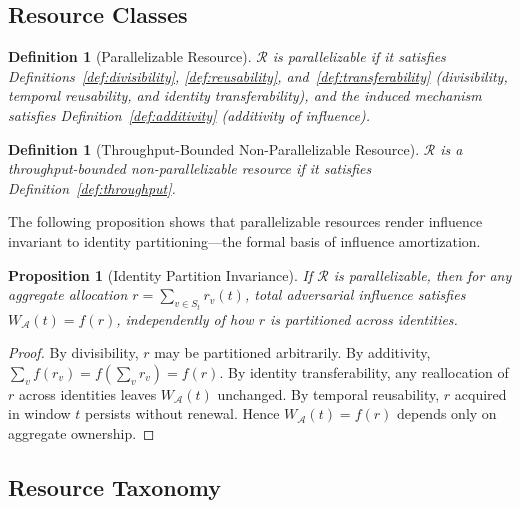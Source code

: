 \documentclass[10pt,journal,compsoc]{IEEEtran}
\newtheorem{proposition}[theorem]{Proposition}
\newtheorem{definition}[theorem]{Definition}
\theoremstyle{remark}
\begin{document}
	\subsection{Resource Classes}
	\label{ssec:classes}
	
	\begin{definition}[Parallelizable Resource]
		\label{def:parallelizable}
		$\mathcal{R}$ is \emph{parallelizable} if it satisfies
		Definitions~\ref{def:divisibility},
		\ref{def:reusability}, and~\ref{def:transferability}
		(divisibility, temporal reusability, and identity
		transferability), and the induced mechanism satisfies
		Definition~\ref{def:additivity} (additivity of
		influence).
	\end{definition}
	
	\begin{definition}[Throughput-Bounded Non-Parallelizable Resource]
		\label{def:nonparallelizable}
		$\mathcal{R}$ is a \emph{throughput-bounded
			non-parallelizable resource} if it satisfies
		Definition~\ref{def:throughput}.
	\end{definition}
	
	The following proposition shows that parallelizable
	resources render influence invariant to identity
	partitioning---the formal basis of influence amortization.
	
	\begin{proposition}[Identity Partition Invariance]
		\label{prop:invariance}
		If $\mathcal{R}$ is parallelizable, then for any
		aggregate allocation $r = \sum_{v \in S_t} r_v(t)$,
		total adversarial influence satisfies
		$W_{\mathcal{A}}(t) = f(r)$,
		independently of how $r$ is partitioned across
		identities.
	\end{proposition}
	
	\begin{proof}
		By divisibility, $r$ may be partitioned arbitrarily.
		By additivity, $\sum_v f(r_v) = f(\sum_v r_v) = f(r)$.
		By identity transferability, any reallocation of $r$
		across identities leaves $W_{\mathcal{A}}(t)$ unchanged.
		By temporal reusability, $r$ acquired in window $t$
		persists without renewal.
		Hence $W_{\mathcal{A}}(t) = f(r)$ depends only on
		aggregate ownership.
	\end{proof}
	
	\subsection{Resource Taxonomy}
	\label{ssec:taxonomy}
	
\end{document}
